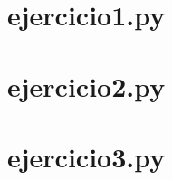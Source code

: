 \documentclass[12pt,a4paper]{report}
\begin{document}

\begin{appendices}
	\section*{ejercicio1.py}
	

	\section*{ejercicio2.py}
	

	\section*{ejercicio3.py}
	

	
\end{appendices}
\end{document}

